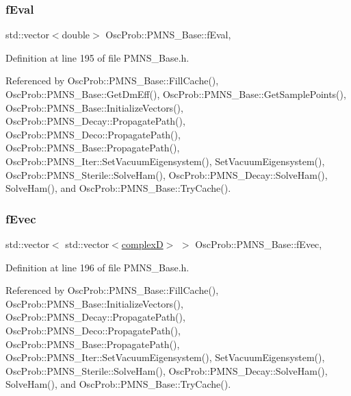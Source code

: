 \subsubsection{\texorpdfstring{f\+Eval}{fEval}}
{\footnotesize\ttfamily std\+::vector$<$double$>$ Osc\+Prob\+::\+P\+M\+N\+S\+\_\+\+Base\+::f\+Eval\hspace{0.3cm}{\ttfamily [protected]}, {\ttfamily [inherited]}}



Definition at line 195 of file P\+M\+N\+S\+\_\+\+Base.\+h.



Referenced by Osc\+Prob\+::\+P\+M\+N\+S\+\_\+\+Base\+::\+Fill\+Cache(), Osc\+Prob\+::\+P\+M\+N\+S\+\_\+\+Base\+::\+Get\+Dm\+Eff(), Osc\+Prob\+::\+P\+M\+N\+S\+\_\+\+Base\+::\+Get\+Sample\+Points(), Osc\+Prob\+::\+P\+M\+N\+S\+\_\+\+Base\+::\+Initialize\+Vectors(), Osc\+Prob\+::\+P\+M\+N\+S\+\_\+\+Decay\+::\+Propagate\+Path(), Osc\+Prob\+::\+P\+M\+N\+S\+\_\+\+Deco\+::\+Propagate\+Path(), Osc\+Prob\+::\+P\+M\+N\+S\+\_\+\+Base\+::\+Propagate\+Path(), Osc\+Prob\+::\+P\+M\+N\+S\+\_\+\+Iter\+::\+Set\+Vacuum\+Eigensystem(), Set\+Vacuum\+Eigensystem(), Osc\+Prob\+::\+P\+M\+N\+S\+\_\+\+Sterile\+::\+Solve\+Ham(), Osc\+Prob\+::\+P\+M\+N\+S\+\_\+\+Decay\+::\+Solve\+Ham(), Solve\+Ham(), and Osc\+Prob\+::\+P\+M\+N\+S\+\_\+\+Base\+::\+Try\+Cache().

\mbox{\label{classOscProb_1_1PMNS__Base_a87be137356c5f27ab83cab5e1298ef8f}} 
\subsubsection{\texorpdfstring{f\+Evec}{fEvec}}
{\footnotesize\ttfamily std\+::vector$<$ std\+::vector$<$\hyperlink{EigenPoint_8h_a67ca8e107e20610c3fff78d5e726ece0}{complexD}$>$ $>$ Osc\+Prob\+::\+P\+M\+N\+S\+\_\+\+Base\+::f\+Evec\hspace{0.3cm}{\ttfamily [protected]}, {\ttfamily [inherited]}}



Definition at line 196 of file P\+M\+N\+S\+\_\+\+Base.\+h.



Referenced by Osc\+Prob\+::\+P\+M\+N\+S\+\_\+\+Base\+::\+Fill\+Cache(), Osc\+Prob\+::\+P\+M\+N\+S\+\_\+\+Base\+::\+Initialize\+Vectors(), Osc\+Prob\+::\+P\+M\+N\+S\+\_\+\+Decay\+::\+Propagate\+Path(), Osc\+Prob\+::\+P\+M\+N\+S\+\_\+\+Deco\+::\+Propagate\+Path(), Osc\+Prob\+::\+P\+M\+N\+S\+\_\+\+Base\+::\+Propagate\+Path(), Osc\+Prob\+::\+P\+M\+N\+S\+\_\+\+Iter\+::\+Set\+Vacuum\+Eigensystem(), Set\+Vacuum\+Eigensystem(), Osc\+Prob\+::\+P\+M\+N\+S\+\_\+\+Sterile\+::\+Solve\+Ham(), Osc\+Prob\+::\+P\+M\+N\+S\+\_\+\+Decay\+::\+Solve\+Ham(), Solve\+Ham(), and Osc\+Prob\+::\+P\+M\+N\+S\+\_\+\+Base\+::\+Try\+Cache().

